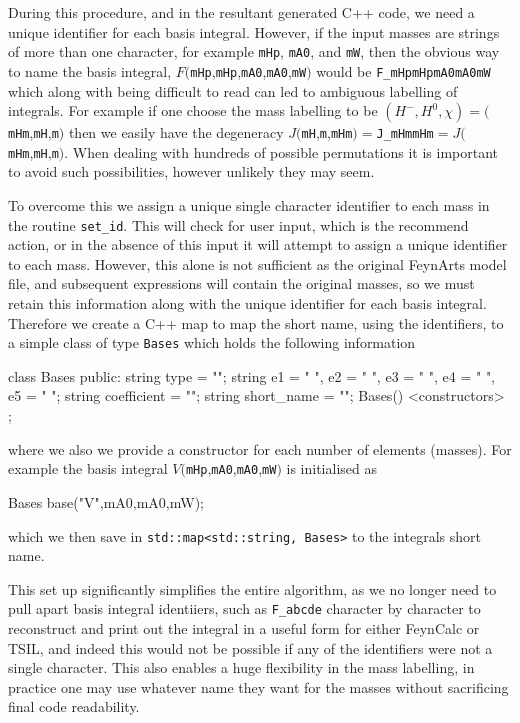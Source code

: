 During this procedure, and in the resultant generated C++ code, we need a unique identifier for each basis integral.  However, if the input masses are strings of more than one character, for example \lstinline{mHp}, \lstinline{mA0}, and \lstinline{mW}, then the obvious way to name the basis integral, $F($\lstinline{mHp},\lstinline{mHp},\lstinline{mA0},\lstinline{mA0},\lstinline{mW}$)$ would be \lstinline{F_mHpmHpmA0mA0mW} which along with being difficult to read can led to ambiguous labelling of integrals.  For example if one choose the mass labelling to be $(H^-, H^0, \chi ) = ($\lstinline{mHm},\lstinline{mH},\lstinline{m}$)$ then we easily have the degeneracy $J($\lstinline{mH},\lstinline{m},\lstinline{mHm}$) =  $\lstinline{J_mHmmHm}$ = J($\lstinline{mHm},\lstinline{mH},\lstinline{m}$)$.  When dealing with hundreds of possible permutations it is important to avoid such possibilities, however unlikely they may seem.

To overcome this we assign a unique single character identifier to each mass in the routine \lstinline{set_id}.  This will check for user input, which is the recommend action, or in the absence of this input it will attempt to assign a unique identifier to each mass.  However, this alone is not sufficient as the original FeynArts model file, and subsequent expressions will contain the original masses, so we must retain this information along with the unique identifier for each basis integral.  Therefore we create a C++ map to map the short name, using the identifiers, to a simple class of type \lstinline{Bases} which holds the following information
\begin{lstcpp}
class Bases
{
public:
	string type = "";
	string e1 = " ", e2 = " ", e3 = " ", e4 = " ", e5 = " ";
	string coefficient = "";
	string short_name = "";
	Bases() {}
	<constructors>
};
\end{lstcpp}
where we also we provide a constructor for each number of elements (masses).  For example the basis integral $V($\lstinline{mHp},\lstinline{mA0},\lstinline{mA0},\lstinline{mW}$)$ is initialised as\begin{lstcpp}
Bases base("V",mA0,mA0,mW);
\end{lstcpp}
which we then save in \lstinline{std::map<std::string, Bases>} to the integrals short name.

This set up significantly simplifies the entire algorithm, as we no longer need to pull apart basis integral identiiers, such as \lstinline{F_abcde} character by character to reconstruct and print out the integral in a useful form for either FeynCalc or TSIL, and indeed this would not be possible if any of the identifiers were not a single character.  This also enables a huge flexibility in the mass labelling, in practice one may use whatever name they want for the masses without sacrificing final code readability.



